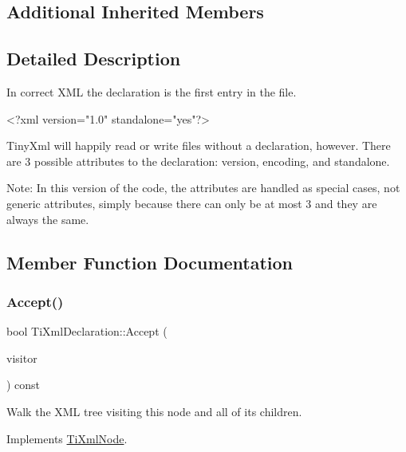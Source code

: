 \subsection*{Additional Inherited Members}


\subsection{Detailed Description}
In correct X\+ML the declaration is the first entry in the file. \begin{DoxyVerb}    <?xml version="1.0" standalone="yes"?>
\end{DoxyVerb}


Tiny\+Xml will happily read or write files without a declaration, however. There are 3 possible attributes to the declaration\+: version, encoding, and standalone.

Note\+: In this version of the code, the attributes are handled as special cases, not generic attributes, simply because there can only be at most 3 and they are always the same. 

\subsection{Member Function Documentation}
\mbox{\label{class_ti_xml_declaration_aa1b6bade6c989407ce9881bdfc73c1e6}} 
\subsubsection{\texorpdfstring{Accept()}{Accept()}}
{\footnotesize\ttfamily bool Ti\+Xml\+Declaration\+::\+Accept (\begin{DoxyParamCaption}\item[{\hyperlink{class_ti_xml_visitor}{Ti\+Xml\+Visitor} $\ast$}]{visitor }\end{DoxyParamCaption}) const\hspace{0.3cm}{\ttfamily [virtual]}}

Walk the X\+ML tree visiting this node and all of its children. 

Implements \hyperlink{class_ti_xml_node_acc0f88b7462c6cb73809d410a4f5bb86}{Ti\+Xml\+Node}.

\mbox{\label{class_ti_xml_declaration_ae46cff6565f299210ab945e78bf28514}} 
